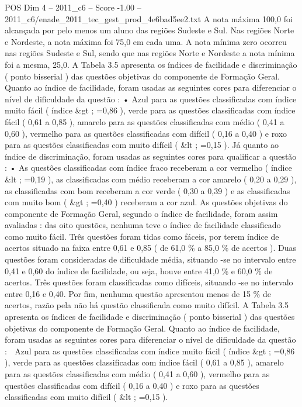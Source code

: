 \begin{textsample}{POS Dim 4 – 2011\_c6 – Score -1.00 – 2011\_c6/enade\_2011\_tec\_gest\_prod\_4e6bad5ee2.txt}
A nota máxima 100,0 foi alcançada por pelo menos um aluno das regiões Sudeste e Sul.
Nas regiões Norte e Nordeste, a nota máxima foi 75,0 em cada uma.
A nota mínima zero ocorreu nas regiões Sudeste e Sul, sendo que nas regiões Norte e Nordeste a nota mínima foi a mesma, 25,0.
A Tabela 3.5 apresenta os índices de facilidade e discriminação ( ponto bisserial ) das questões objetivas do componente de Formação Geral.
Quanto ao índice de facilidade, foram usadas as seguintes cores para diferenciar o nível de dificuldade da questão : • Azul para as questões classificadas com índice muito fácil ( índice \&gt ; =0,86 ), verde para as questões classificadas com índice fácil ( 0,61 a 0,85 ), amarelo para as questões classificadas com médio ( 0,41 a 0,60 ), vermelho para as questões classificadas com difícil ( 0,16 a 0,40 ) e roxo para as questões classificadas com muito difícil ( \&lt ; =0,15 ).
Já quanto ao índice de discriminação, foram usadas as seguintes cores para qualificar a questão : • As questões classificadas com índice fraco receberam a cor vermelho ( índice \&lt ; =0,19 ), as classificadas com médio receberam a cor amarelo ( 0,20 a 0,29 ), as classificadas com bom receberam a cor verde ( 0,30 a 0,39 ) e as classificadas com muito bom ( \&gt ; =0,40 ) receberam a cor azul.
As questões objetivas do componente de Formação Geral, segundo o índice de facilidade, foram assim avaliadas : das oito questões, nenhuma teve o índice de facilidade classificado como muito fácil.
Três questões foram tidas como fáceis, por terem índice de acertos situado na faixa entre 0,61 e 0,85 ( de 61,0 \% a 85,0 \% de acertos ).
Duas questões foram consideradas de dificuldade média, situando -se no intervalo entre 0,41 e 0,60 do índice de facilidade, ou seja, houve entre 41,0 \% e 60,0 \% de acertos.
Três questões foram classificadas como difíceis, situando -se no intervalo entre 0,16 e 0,40.
Por fim, nenhuma questão apresentou menos de 15 \% de acertos, razão pela não há questão classificada como muito difícil.
A Tabela 3.5 apresenta os índices de facilidade e discriminação ( ponto bisserial ) das questões objetivas do componente de Formação Geral.
Quanto ao índice de facilidade, foram usadas as seguintes cores para diferenciar o nível de dificuldade da questão :  Azul para as questões classificadas com índice muito fácil ( índice \&gt ; =0,86 ), verde para as questões classificadas com índice fácil ( 0,61 a 0,85 ), amarelo para as questões classificadas com médio ( 0,41 a 0,60 ), vermelho para as questões classificadas com difícil ( 0,16 a 0,40 ) e roxo para as questões classificadas com muito difícil ( \&lt ; =0,15 ).

\end{textsample}
